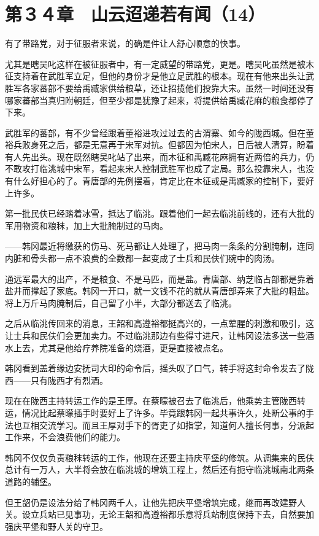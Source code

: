 \section{第３４章　山云迢递若有闻（14）}

有了带路党，对于征服者来说，的确是件让人舒心顺意的快事。

尤其是瞎吴叱这样在被征服者中，有一定威望的带路党，更是。瞎吴叱虽然是被木征支持着在武胜军立足，但他的身份才是他立足武胜的根本。现在有他来出头让武胜军各家蕃部不要给禹臧家供给粮草，还让招揽他们投靠大宋。虽然一时间还没有哪家蕃部当真归附朝廷，但至少都是犹豫了起来，将提供给禹臧花麻的粮食都停了下来。

武胜军的蕃部，有不少曾经跟着董裕进攻过过去的古渭寨、如今的陇西城。但在董裕兵败身死之后，都是无意再于宋军对抗。但都因为怕宋人，日后被人清算，盼着有人先出头。现在既然瞎吴叱站了出来，而木征和禹臧花麻拥有近两倍的兵力，仍不敢攻打临洮城中宋军，看起来宋人控制武胜军也成了定局。那么投靠宋人，也没有什么好担心的了。青唐部的先例摆着，肯定比在木征或是禹臧家的控制下，要好上许多。

第一批民伕已经踏着冰雪，抵达了临洮。跟着他们一起去临洮前线的，还有大批的军用物资和粮秣，加上大批腌制过的马肉。

——韩冈最近将缴获的伤马、死马都让人处理了，把马肉一条条的分割腌制，连同内脏和骨头都一点不浪费的全数都一起变成了士兵和民伕们碗中的肉汤。

通远军最大的出产，不是粮食、不是马匹，而是盐。青唐部、纳芝临占部都是靠着盐井而撑起了家底。韩冈一开口，就一文钱不花的就从青唐部弄来了大批的粗盐。将上万斤马肉腌制后，自己留了小半，大部分都送去了临洮。

之后从临洮传回来的消息，王韶和高遵裕都挺高兴的，一点荤腥的刺激和吸引，这让士兵和民伕们会更加卖力。不过临洮那边有些得寸进尺，让韩冈设法多送一些酒水上去，尤其是他给疗养院准备的烧酒，更是直接被点名。

韩冈看到盖着缘边安抚司大印的命令后，摇头叹了口气，转手将这封命令发去了陇西——只有陇西才有烈酒。

现在在陇西主持转运工作的是王厚。在蔡曚被召去了临洮后，他乘势主管陇西转运，情况比起蔡曚插手时要好上了许多。毕竟跟韩冈一起共事许久，处断公事的手法也互相交流学习。而且王厚对手下的胥吏了如指掌，知道何人擅长何事，分派起工作来，不会浪费他们的能力。

韩冈不仅仅负责粮秣转运的工作，他现在还要主持庆平堡的修筑。从调集来的民伕总计有一万人，大半将会放在临洮城的增筑工程上，然后还有扼守临洮城南北两条道路的辅堡。

但王韶仍是设法分给了韩冈两千人，让他先把庆平堡增筑完成，继而再改建野人关。设立兵站已见事功，无论王韶和高遵裕都乐意将兵站制度保持下去，自然要加强庆平堡和野人关的守卫。

